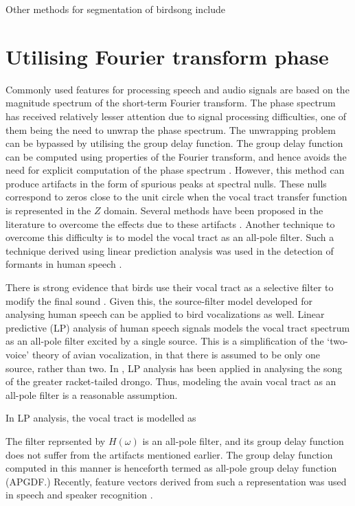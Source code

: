 \documentclass[a4paper]{article}
\begin{document}
Other methods for segmentation of birdsong include

\section{Utilising Fourier transform phase}

Commonly used features for processing speech and audio signals are based on the
magnitude spectrum of the short-term Fourier transform. The phase spectrum has
received relatively lesser attention due to signal processing difficulties, one
of them being the need to unwrap the phase spectrum. The unwrapping problem can be
bypassed by utilising the group delay function. The group delay function can be
computed using properties of the Fourier transform, and hence avoids the need
for explicit computation of the phase spectrum \cite{gdDeriv}. 
However, this method can produce
artifacts in the form of spurious peaks at spectral nulls. These nulls
correspond to zeros close to the unit circle when the vocal tract transfer
function is represented in the $Z$ domain. 
Several methods have been proposed in the literature to overcome the effects due
to these artifacts \cite{modgdf, productSpectrum}. Another technique to overcome
this difficulty is to model the vocal tract as an all-pole filter. Such a
technique derived using linear prediction analysis was used in the detection of
formants in human speech \cite{yegnaFormant}. 


There is strong evidence that birds use their vocal tract as a selective filter
to modify the final sound \cite{catchpole}.  Given this, the source-filter model
developed for analysing human speech can be applied to bird vocalizations as
well.  Linear predictive (LP) analysis of human speech signals models the vocal
tract spectrum as an all-pole filter \cite{makhoul} excited by a single source.
This is a simplification of the `two-voice' theory of avian vocalization, in
that there is assumed to be only one source, rather than two.  In
\cite{agnihotri}, LP analysis has been applied in analysing the song of the
greater racket-tailed drongo. Thus, modeling the avain vocal tract as an
all-pole filter is a reasonable assumption.

In LP analysis, the vocal tract is modelled as 

The filter reprsented by $H(\omega)$ is an all-pole filter, and its group delay
function does not suffer from the artifacts mentioned earlier. The group delay
function computed in this manner is henceforth termed as all-pole group delay
function (APGDF.) Recently, feature vectors
derived from such a representation was used in speech \cite{drugman} and speaker
recognition \cite{padman}. 
\end{document}
